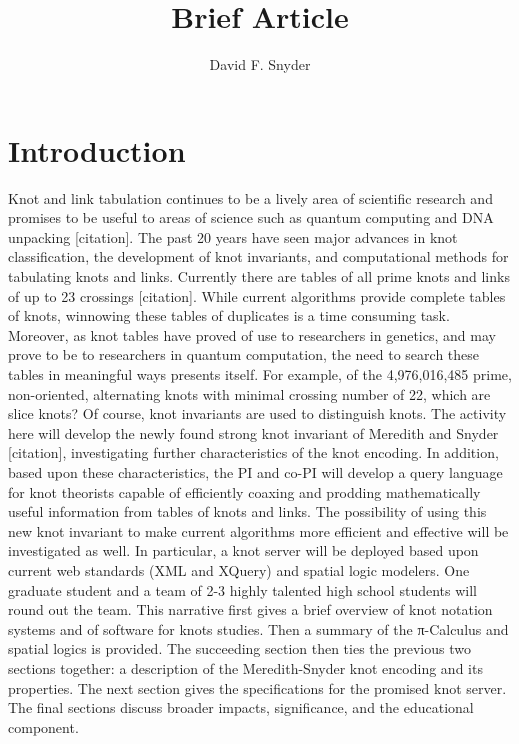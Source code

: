 \documentclass[12pt]{amsart}
\title{Brief Article}
\author{David F. Snyder}
\begin{document}
 
\section{Introduction}\label{sec:introduction} %
   Knot and link tabulation continues to be a lively area of scientific research and promises to be useful to areas of science such as quantum computing and DNA unpacking [citation].  The past 20 years have seen major advances in knot classification, the development of knot invariants, and computational methods for tabulating knots and links.  Currently there are tables of all prime knots and links of up to 23 crossings [citation]. While current algorithms provide complete tables of knots, winnowing these tables of duplicates is a time consuming task. Moreover, as knot tables have proved of use to researchers in genetics, and may prove to be to researchers in quantum computation, the need to search these tables in meaningful ways presents itself. For example, of the 4,976,016,485 prime, non-oriented, alternating knots with minimal crossing number of 22, which are slice knots?  Of course, knot invariants are used to distinguish knots. The activity here will develop the newly found strong knot invariant of Meredith and Snyder [citation], investigating further characteristics of the knot encoding. In addition, based upon these characteristics, the PI and co-PI will develop a query language for knot theorists capable of efficiently coaxing and prodding mathematically useful information from tables of knots and links. The possibility of using this new knot invariant to make current algorithms more efficient and effective will be investigated as well. In particular, a knot server will be deployed based upon current web standards (XML and XQuery) and spatial logic modelers. One graduate student and a team of 2-3 highly talented high school students will round out the team.
This narrative first gives a brief overview of knot notation systems and of software for knots studies. Then a summary of the π-Calculus and spatial logics is provided. The succeeding section then ties the previous two sections together: a description of the Meredith-Snyder knot encoding and its properties. The next section gives the specifications for the promised knot server. The final sections discuss broader impacts, significance, and the educational component.
\end{document}
